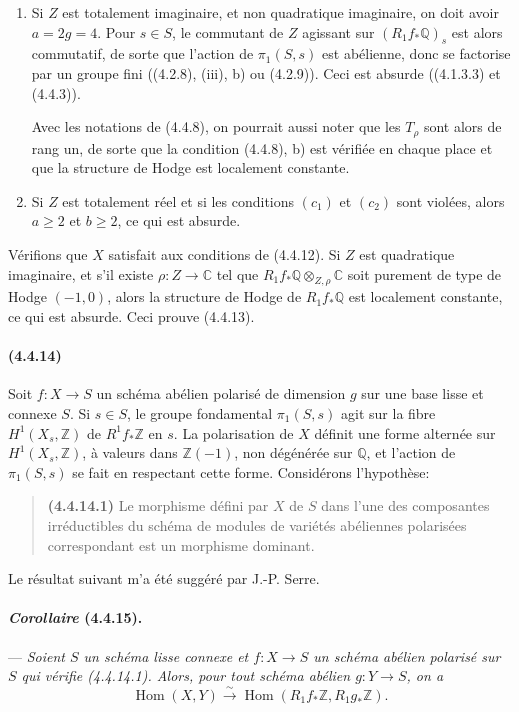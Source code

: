 \documentclass[10pt]{article}
\newcommand{\C}{\mathbb C}
\newcommand{\Q}{\mathbb Q}
\newcommand{\Z}{\mathbb Z}
\newcommand{\Hom}{\operatorname{Hom}}
\newcommand{\iso}{\xrightarrow{\sim}}
\begin{document}
\begin{enumerate}[label=\arabic*)]
\item Si $Z$ est totalement imaginaire, et non quadratique imaginaire, on doit avoir $a=2g=4$. Pour $s\in S$, le commutant de $Z$ agissant sur $(R_1f_*\Q)_s$ est alors commutatif, de sorte que l'action de $\pi_1(S,s)$ est abélienne, donc se factorise par un groupe fini ((4.2.8), (iii), b) ou (4.2.9)). Ceci est absurde ((4.1.3.3) et (4.4.3)).

Avec les notations de (4.4.8), on pourrait aussi noter que les $T_\rho$ sont alors de rang un, de sorte que la condition (4.4.8), b) est vérifiée en chaque place et que la structure de Hodge est localement constante.

\item Si $Z$ est totalement réel et si les conditions $(c_1)$ et $(c_2)$ sont violées, alors $a\ge2$ et $b\ge2$, ce qui est absurde.
\end{enumerate}

Vérifions que $X$ satisfait aux conditions de (4.4.12). Si $Z$ est quadratique imaginaire, et s'il existe $\rho:Z\to\C$ tel que $R_1f_*\Q\otimes_{Z,\rho}\C$ soit purement de type de Hodge $(-1,0)$, alors la structure de Hodge de $R_1f_*\Q$ est localement constante, ce qui est absurde. Ceci prouve (4.4.13).

\paragraph{(4.4.14)} Soit $f:X\to S$ un schéma abélien polarisé de dimension $g$ sur une base lisse et connexe $S$. Si $s\in S$, le groupe fondamental $\pi_1(S,s)$ agit sur la fibre $H^1(X_s,\Z)$ de $R^1f_*\Z$ en $s$. La polarisation de $X$ définit une forme alternée sur $H^1(X_s,\Z)$, à valeurs dans $\Z(-1)$, non dégénérée sur $\Q$, et l'action de $\pi_1(S,s)$ se fait en respectant cette forme. Considérons l'hypothèse:
\begin{quote}
\noindent\textbf{(4.4.14.1)} Le morphisme défini par $X$ de $S$ dans l'une des composantes irréductibles du schéma de modules de variétés abéliennes polarisées correspondant est un morphisme dominant.
\end{quote}
Le résultat suivant m'a été suggéré par J.-P. Serre.

\paragraph{\emph{Corollaire} (4.4.15).} --- {\itshape Soient $S$ un schéma lisse connexe et $f:X\to S$ un schéma abélien polarisé sur $S$ qui vérifie (4.4.14.1). Alors, pour tout schéma abélien $g:Y\to S$, on a
\[
\Hom(X,Y)\iso\Hom(R_1f_*\Z,R_1g_*\Z).
\]}
\end{document}

